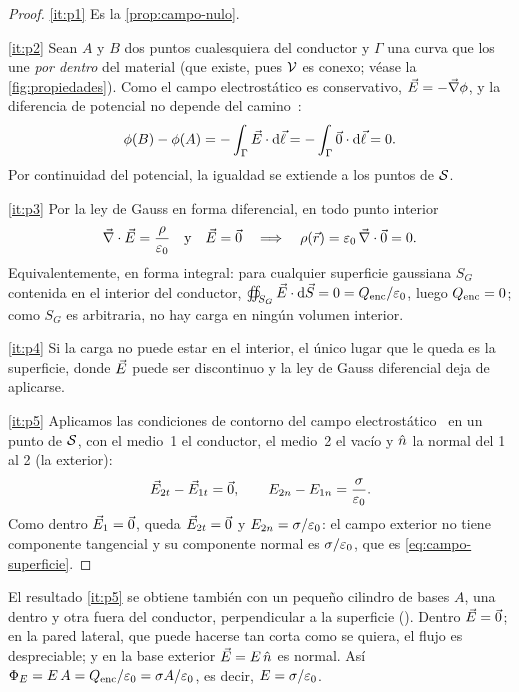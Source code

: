 \begin{proof}
\ref{it:p1} Es la \cref{prop:campo-nulo}.

\ref{it:p2} Sean $A$ y $B$ dos puntos cualesquiera del conductor y $\Gamma$ una curva que los une \emph{por dentro} del material (que existe, pues
$\mathcal{V}$ es conexo; véase la \cref{fig:propiedades}). Como el campo electrostático es conservativo, $\vec{E}=-\vec{\nabla}\phi$, y la diferencia de potencial
no depende del camino~\cite{TEMA0}:
\[
  \phi(B)-\phi(A)=-\int_{\Gamma}\vec{E}\cdot\mathrm{d}\vec{\ell}=-\int_{\Gamma}\vec{0}\cdot\mathrm{d}\vec{\ell}=0 .
\]
Por continuidad del potencial, la igualdad se extiende a los puntos de $\mathcal{S}$.

\ref{it:p3} Por la ley de Gauss en forma diferencial, en todo punto interior
\[
  \vec{\nabla}\cdot\vec{E}=\frac{\rho}{\varepsilon_{0}}\quad\text{y}\quad\vec{E}=\vec{0}\quad\Longrightarrow\quad\rho(\vec{r})=\varepsilon_{0}\,\vec{\nabla}\cdot\vec{0}=0 .
\]
Equivalentemente, en forma integral: para cualquier superficie gaussiana $S_G$ contenida en el interior del conductor,
$\oiint_{S_G}\vec{E}\cdot\mathrm{d}\vec{S}=0=Q_{\mathrm{enc}}/\varepsilon_{0}$, luego $Q_{\mathrm{enc}}=0$; como $S_G$ es arbitraria, no hay carga en ningún volumen interior.

\ref{it:p4} Si la carga no puede estar en el interior, el único lugar que le queda es la superficie, donde $\vec{E}$ puede ser discontinuo y la ley de
Gauss diferencial deja de aplicarse.

\ref{it:p5} Aplicamos las condiciones de contorno del campo electrostático~\cite[§6]{TEMA1} en un punto de $\mathcal{S}$, con el medio~1 el conductor, el
medio~2 el vacío y $\hat{n}$ la normal del 1 al 2 (la exterior):
\[
  \vec{E}_{2t}-\vec{E}_{1t}=\vec{0},\qquad E_{2n}-E_{1n}=\frac{\sigma}{\varepsilon_{0}} .
\]
Como dentro $\vec{E}_1=\vec{0}$, queda $\vec{E}_{2t}=\vec{0}$ y $E_{2n}=\sigma/\varepsilon_{0}$: el campo exterior no tiene componente tangencial y su componente
normal es $\sigma/\varepsilon_{0}$, que es \cref{eq:campo-superficie}.
\end{proof}



\begin{observacion}\label{obs:pastillero}
El resultado \ref{it:p5} se obtiene también con un pequeño cilindro de bases $A$, una dentro y otra fuera del conductor, perpendicular a la
superficie (). Dentro $\vec{E}=\vec{0}$; en la pared lateral, que puede hacerse tan corta como se quiera, el flujo es
despreciable; y en la base exterior $\vec{E}=E\,\hat{n}$ es normal. Así $\Phi_{E}=E\,A=Q_{\mathrm{enc}}/\varepsilon_{0}=\sigma A/\varepsilon_{0}$, es decir, $E=\sigma/\varepsilon_{0}$.
\end{observacion}

